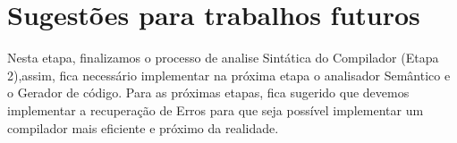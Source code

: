 \chapter{Sugestões para trabalhos futuros}

Nesta etapa, finalizamos o processo de analise Sintática do Compilador (Etapa 2),assim, fica necessário implementar na próxima etapa o analisador Semântico e o Gerador de código.
Para as próximas etapas, fica sugerido que devemos implementar a recuperação de Erros para que seja possível implementar um compilador mais eficiente e próximo da realidade.